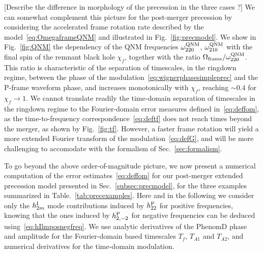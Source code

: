 \documentclass[aps,showpacs,twocolumn,
prd,superscriptaddress,nofootinbib]{revtex4-1}
\newcommand{\Tf}{T_{f}}
\newcommand{\SM}[1]{{\color{Red} #1}}
\begin{document}
\SM{[Describe the difference in morphology of the precession in the three cases ?]}
We can somewhat complement this picture for the post-merger precession by considering the accelerated frame rotation rate described by the model~\eqref{eq:OmegaframeQNM} and illustrated in Fig.~\ref{fig:precmodel}. We show in Fig.~\ref{fig:QNM} the dependency of the QNM frequencies $\omega_{220}^{\rm QNM}$, $\omega_{210}^{\rm QNM}$ with the final spin of the remnant black hole $\chi_{f}$, together with the ratio $\Omega_{\rm frame} / \omega^{\rm QNM}_{220}$. This ratio is characteristic of the separation of timescales, in the ringdown regime, between the phase of the modulation~\eqref{eq:wignerphasesimpleprec} and the P-frame waveform phase, and increases monotonically with $\chi_{f}$, reaching $\sim 0.4$ for $\chi_{f} \rightarrow 1$. We cannot translate readily the time-domain separation of timescales in the ringdown regime to the Fourier-domain error measures defined in~\eqref{eq:deffom}, as the time-to-frequency correspondence~\eqref{eq:deftf} does not reach times beyond the merger, as shown by Fig.~\ref{fig:tf}. However, a faster frame rotation will yield a more extended Fourier transform of the modulation~\eqref{eq:defG}, and will be more challenging to accomodate with the formalism of Sec.~\ref{sec:formalism}.

To go beyond the above order-of-magnitude picture, we now present a numerical computation of the error estimates~\eqref{eq:deffom} for our post-merger extended precession model presented in Sec.~\ref{subsec:precmodel}, for the three examples summarized in Table.~\ref{tab:precexamples}. Here and in the following we consider only the $h^{\rm I}_{2 m}$ mode contributions induced by $h^{\rm P}_{22}$ for positive frequencies, knowing that the ones induced by $h^{\rm P}_{2,-2}$ for negative frequencies can be deduced using~\eqref{eq:hIlmposnegfreq}. We use analytic derivatives of the PhenomD phase and amplitude for the Fourier-domain based timescales $\Tf$, $T_{A1}$ and $T_{A2}$, and numerical derivatives for the time-domain modulation.

\end{document}
